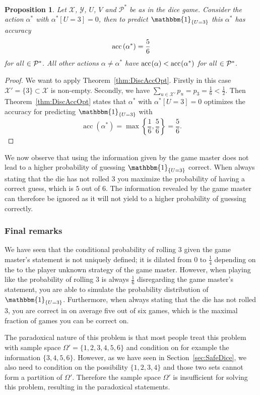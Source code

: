 \documentclass[a4paper]{report}
\theoremstyle{plain}
\newtheorem{proposition}[theorem]{Proposition}
\theoremstyle{definition}
\theoremstyle{remark}
\numberwithin{equation}{chapter}
\let\P\relax
\DeclareMathOperator{\P}{\mathbb{P}}
\DeclareMathOperator{\1}{\mathbbm{1}}
\newcommand{\X}{\mathcal{X}}
\newcommand{\Y}{\mathcal{Y}}
\DeclareMathOperator{\acc}{acc}
\newcommand{\Pmod}{\mathcal{P}^*}
\newcommand{\DieInd}{\1_{\{U=3\}}}
\begin{document}
\begin{proposition}
Let $\X$, $\Y$, $U$, $V$ and $\Pmod$ be as in the dice game. Consider the action $\alpha^*$ with $\alpha^*[U=3]=0$, then to predict $\DieInd$ this $\alpha^*$ has accuracy
\begin{equation}
\acc^{\P}\left(\alpha^*\right)=\frac{5}{6}
\end{equation}
for all $\P\in\Pmod$. All other actions $\alpha\neq\alpha^*$ have $\acc^{\P}(\alpha)<\acc^{\P}(\alpha^*)$ for all $\P\in\Pmod$.
\end{proposition}
\begin{proof}
We want to apply Theorem~\ref{thm:DiscAccOpt}. Firstly in this case $\X'=\{3\}\subset\X$ is non-empty. Secondly, we have $\sum_{u\in\X'}p_u=p_3=\frac{1}{6}<\frac{1}{2}$. Then Theorem~\ref{thm:DiscAccOpt} states that $\alpha^*$ with $\alpha^*[U=3]=0$ optimizes the accuracy for predicting $\DieInd$ with
\begin{equation}
\acc\left(\alpha^*\right)=\max\left\{\frac{1}{6},\frac{5}{6}\right\}=\frac{5}{6}.
\end{equation}
\end{proof}


We now observe that using the information given by the game master does not lead to a higher probability of guessing $\DieInd$ correct. When always stating that the die has not rolled $3$ you maximize the probability of having a correct guess, which is $5$ out of $6$. The information revealed by the game master can therefore be ignored as it will not yield to a higher probability of guessing correctly.

\subsubsection{Final remarks}
We have seen that the conditional probability of rolling $3$ given the game master's statement is not uniquely defined; it is dilated from $0$ to $\frac{1}{4}$ depending on the to the player unknown strategy of the game master. However, when playing like the probability of rolling $3$ is always $\frac{1}{6}$ disregarding the game master's statement, you are able to simulate the probability distribution of $\DieInd$. Furthermore, when always stating that the die has not rolled $3$, you are correct in on average five out of six games, which is the maximal fraction of games you can be correct on.

The paradoxical nature of this problem is that most people treat this problem with sample space $\Omega'=\{1,2,3,4,5,6\}$ and condition on for example the information $\{3,4,5,6\}$. However, as we have seen in Section~\ref{sec:SafeDice}, we also need to condition on the possibility $\{1,2,3,4\}$ and those two sets cannot form a partition of $\Omega'$. Therefore the sample space $\Omega'$ is insufficient for solving this problem, resulting in the paradoxical statements.
\end{document}
